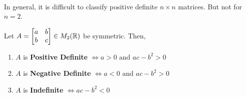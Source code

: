 \documentclass[../Analysis-3]{subfiles}
\begin{document}
\

In general, it is difficult to classify positive definite $n \times n$ matrices. But not for $n = 2$.

\begin{Thm}{}{}
    Let $A = \begin{bmatrix}
            a & b \\
            b & c
        \end{bmatrix} \in M_2(\mathbb{R}) $ be symmetric. Then,
    \begin{enumerate}[label=(\roman*)]
        \item $A$ is \textbf{Positive Definite} $ \Longleftrightarrow a > 0 \text{ and } ac -b^2 >0 $ \label{charpd}
        \item $A$ is \textbf{Negative Definite} $ \Longleftrightarrow a < 0 \text{ and } ac -b^2 >0 $ \label{charnd}
        \item $A$ is \textbf{Indefinite} $ \Longleftrightarrow ac -b^2 <0 $ \label{charind}
    \end{enumerate}
\end{Thm}
\end{document}
